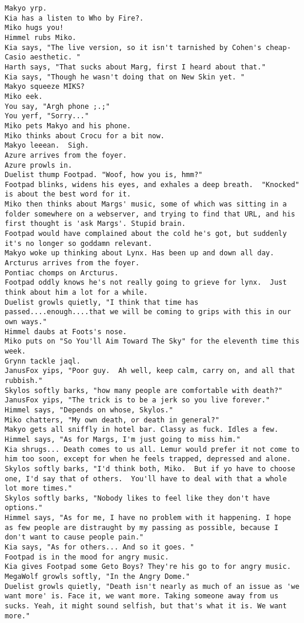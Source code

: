\begin{verbatim}
Makyo yrp.
Kia has a listen to Who by Fire?.
Miko hugs you!
Himmel rubs Miko.
Kia says, "The live version, so it isn't tarnished by Cohen's cheap-Casio aesthetic. "
Harth says, "That sucks about Marg, first I heard about that."
Kia says, "Though he wasn't doing that on New Skin yet. "
Makyo squeeze MIKS?
Miko eek.
You say, "Argh phone ;.;"
You yerf, "Sorry..."
Miko pets Makyo and his phone.
Miko thinks about Crocu for a bit now.
Makyo leeean.  Sigh.
Azure arrives from the foyer.
Azure prowls in.
Duelist thump Footpad. "Woof, how you is, hmm?"
Footpad blinks, widens his eyes, and exhales a deep breath.  "Knocked" is about the best word for it.
Miko then thinks about Margs' music, some of which was sitting in a folder somewhere on a webserver, and trying to find that URL, and his first thought is 'ask Margs'. Stupid brain.
Footpad would have complained about the cold he's got, but suddenly it's no longer so goddamn relevant.
Makyo woke up thinking about Lynx. Has been up and down all day.
Arcturus arrives from the foyer.
Pontiac chomps on Arcturus.
Footpad oddly knows he's not really going to grieve for lynx.  Just think about him a lot for a while.
Duelist growls quietly, "I think that time has passed....enough....that we will be coming to grips with this in our own ways."
Himmel daubs at Foots's nose.
Miko puts on "So You'll Aim Toward The Sky" for the eleventh time this week.
Grynn tackle jaql.
JanusFox yips, "Poor guy.  Ah well, keep calm, carry on, and all that rubbish."
Skylos softly barks, "how many people are comfortable with death?"
JanusFox yips, "The trick is to be a jerk so you live forever."
Himmel says, "Depends on whose, Skylos."
Miko chatters, "My own death, or death in general?"
Makyo gets all sniffly in hotel bar. Classy as fuck. Idles a few.
Himmel says, "As for Margs, I'm just going to miss him."
Kia shrugs... Death comes to us all. Lemur would prefer it not come to him too soon, except for when he feels trapped, depressed and alone.
Skylos softly barks, "I'd think both, Miko.  But if yo have to choose one, I'd say that of others.  You'll have to deal with that a whole lot more times."
Skylos softly barks, "Nobody likes to feel like they don't have options."
Himmel says, "As for me, I have no problem with it happening. I hope as few people are distraught by my passing as possible, because I don't want to cause people pain."
Kia says, "As for others... And so it goes. "
Footpad is in the mood for angry music.
Kia gives Footpad some Geto Boys? They're his go to for angry music.
MegaWolf growls softly, "In the Angry Dome."
Duelist growls quietly, "Death isn't nearly as much of an issue as 'we want more' is. Face it, we want more. Taking someone away from us sucks. Yeah, it might sound selfish, but that's what it is. We want more."

\end{verbatim}

